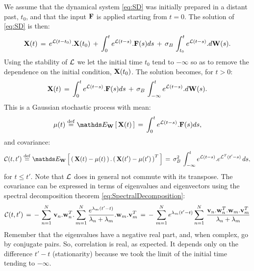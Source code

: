 \documentclass{article}
\begin{document}
We assume that the dynamical system \eqref{eq:SD} was initially prepared in a distant past, $t_0$, and that the input
$\bold{F}$ is applied starting from $t=0$. The solution of \eqref{eq:SD} is then:
%
\begin{equation}\label{eq:SolSDGen}
\bold{X}(t)\,=\, e^{{\mathcal L}(t-t_0)}.\bold{X}(t_0) \,+\,  \int_{0}^t e^{{\mathcal L}(t-s)}.\bold{F}(s) ds \,+\, \sigma_B \, \int_{t_0}^t e^{{\mathcal L}(t-s)}.d\bold{W}(s). 
\end{equation}
%
Using the stability of ${\mathcal L}$ we let the initial time $t_0$ tend to $-\infty$ so as to remove the dependence on the initial condition, $\bold{X}(t_0) $. The solution becomes, for $t>0$:
%
\begin{equation}\label{eq:SolSD}
\bold{X}(t)\,=\, \int_{0}^t e^{{\mathcal L}(t-s)}.\bold{F}(s) ds \,+\, \sigma_B \, \int_{-\infty}^t e^{{\mathcal L}(t-s)}.d\bold{W}(s). 
\end{equation}
%
This is a Gaussian stochastic process with mean:
%
\begin{equation}\label{eq:Exp_X}
\mu(t) \deq \Exp{\vW}{\vX(t)} \,=\, \int_{0}^t e^{\cL(t-s)}.\vF(s) ds, 
\end{equation}
%
and covariance:
%
\begin{equation}\label{eq:Cov_X}
\cC(t,t') \deq \Exp{\vW}{\pare{\vX(t)-\mu(t)}.\pare{\vX(t')-\mu(t')}^T} \,=\, \sigma_B^2 \, \int_{-\infty}^t e^{\cL(t-s)}.e^{\cLT(t'-s)} \, ds, 
\end{equation}
%
for $t\leq t'$. Note that ${\mathcal L}$ does in general  not commute with its transpose. The covariance can be expressed in terms of eigenvalues and eigenvectors using the spectral decomposition theorem \eqref{eq:SpectralDecomposition}:
%
%
\begin{equation}\label{eq:Cov_X_Spectral}
{\mathcal C}(t,t') \,=\, -\, \sum_{n=1}^N \,\bold{v}_n.\bold{w}^T_n. \sum_{m=1}^N \frac{e^{\lambda_m(t'-t)}}{\lambda_n+\lambda_m}.\bold{w}_m.\bold{v}^T_m
\,=\, -\,  \sum_{m=1}^N e^{\lambda_m(t'-t)} \sum_{n=1}^N \, \frac{\bold{v}_n.\bold{w}^T_n.\bold{w}_m.\bold{v}^T_m}{\lambda_n+\lambda_m}
\end{equation}
Remember that the eigenvalues have a negative real part, and, when complex, go by conjugate pairs. So, correlation is real, as expected. It depends only on the difference $t'-t$ (stationarity) because we took the limit of the initial time tending to $-\infty$. 
\end{document}
